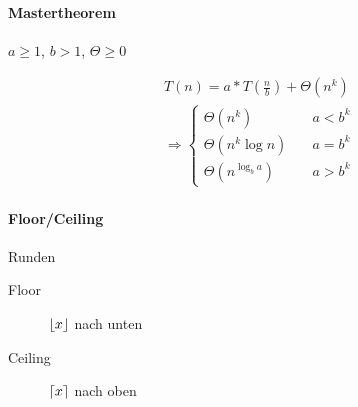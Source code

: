 \begin{mzImportant}
  \paragraph{Mastertheorem} $a \geq 1$, $b > 1$, $\Theta \geq 0$

  \begin{gather*}
    T(n) = a * T( \frac{n}{b} ) + \Theta (n^k) \\
    \Rightarrow \begin{cases}
      \Theta ( n^k ) \quad          & a < b^k \\
      \Theta ( n^k \log n ) \quad   & a = b^k \\
      \Theta ( n^{\log_b a} ) \quad & a > b^k
    \end{cases}
  \end{gather*}
\end{mzImportant}


\paragraph{Floor/Ceiling} Runden

\begin{description}
  \item [Floor] $\lfloor x\rfloor$ nach unten

  \item [Ceiling] $\lceil x\rceil$ nach oben
\end{description}
